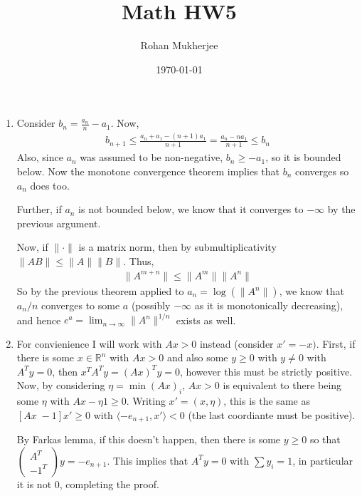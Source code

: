 \documentclass[12pt]{article}
\title{Math HW5}
\date{\today}
\author{Rohan Mukherjee}
\theoremstyle{definitionstyle}
\def\mbb#1{\mathbb{#1}}
\def\R{\mbb{R}}
\newcommand{\mg}[1]{\| #1 \|}
\renewcommand{\ip}[1]{\langle#1\rangle}
\newcommand{\1}{\mathds 1}
\begin{document}
    \maketitle
    \begin{enumerate}
        \item Consider $b_n = \frac{a_n}{n} - a_1$. Now,
        \begin{align*}
            b_{n+1} \leq \frac{a_n + a_1 - (n+1)a_1}{n+1} = \frac{a_n - na_1}{n+1} \leq b_n
        \end{align*} 
        Also, since $a_n$ was assumed to be non-negative, $b_n \geq -a_1$, so it is bounded below. Now the monotone convergence theorem implies that $b_n$ converges so $a_n$ does too.

        Further, if $a_n$ is not bounded below, we know that it converges to $-\infty$ by the previous argument. 

        Now, if $\mg{\cdot}$ is a matrix norm, then by submultiplicativity $\mg{AB} \leq \mg{A} \mg{B}$. Thus,
        \begin{align*}
            \mg{A^{m+n}} \leq \mg{A^m} \mg{A^n} 
        \end{align*}
        So by the previous theorem applied to $a_n = \log(\mg{A^n})$, we know that $a_n/n$ converges to some $a$ (possibly $-\infty$ as it is monotonically decreasing), and hence $e^a = \lim_{n \to \infty} \mg{A^n}^{1/n}$ exists as well.

        \item For convienience I will work with $Ax > 0$ instead (consider $x' = -x)$. First, if there is some $x \in \R^n$ with $Ax > 0$ and also some $y \geq 0$ with $y \neq 0$ with $A^Ty = 0$, then $x^TA^Ty = (Ax)^Ty = 0$, however this must be strictly positive. Now, by considering $\eta = \min (Ax)_i$, $Ax > 0$ is equivalent to there being some $\eta$ with $Ax - \eta 1 \geq 0$. Writing $x' = (x, \eta)$, this is the same as $[Ax \; -1]x' \geq 0$ with $\ip{-e_{n+1}, x'} < 0$ (the last coordiante must be positive). 

        By Farkas lemma, if this doesn't happen, then there is some $y \geq 0$ so that $\begin{pmatrix}
            A^T \\
            -1^T
        \end{pmatrix}y = -e_{n+1}$. This implies that $A^Ty = 0$ with $\sum y_i = 1$, in particular it is not 0, completing the proof.
        

\end{enumerate}
\end{document}
